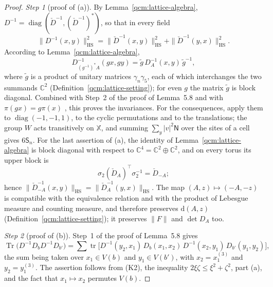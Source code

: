 \documentclass[11pt,letterpaper,reqno]{amsart}
\theoremstyle{definition}
\begin{document}
\begin{proof}
\emph{Step 1} (proof of (a)).
By Lemma~\ref{qcm:lattice-algebra}, $D^{-1}=\operatorname{diag}(\check D^{-1},(\check D^{-1})^*)$, so that in every field
\begin{equation*}
\|D^{-1}(x,y)\|^2_{\mathrm{HS}}=\|\check D^{-1}(x,y)\|^2_{\mathrm{HS}}+\|\check D^{-1}(y,x)\|^2_{\mathrm{HS}}.
\end{equation*}
According to Lemma~\ref{qcm:lattice-algebra},
\begin{equation*}
D^{-1}_{(g^{-1})^*A}(gx,gy)=\tilde g\,D_A^{-1}(x,y)\,\tilde g^{-1},
\end{equation*}
where $\tilde g$ is a product of unitary matrices $\gamma_n\gamma_5$, each of which interchanges the two summands $\mathbb C^2$ (Definition~\ref{qcm:lattice-setting}); for even $g$ the matrix $\tilde g$ is block diagonal.
Combined with Step~2 of the proof of Lemma~5.8 and with $\pi(gx)=g\pi(x)$ \cite[Proposition~2.1]{QEDConstruction}, this proves the invariances.
For the consequences, apply them to $\operatorname{diag}(-1,-1,1)$, to the cyclic permutations and to the translations; the group $W$ acts transitively on $\mathbb X$, and summing $\sum_y|v|^2\mathsf N$ over the sites of a cell gives $6\mathsf S_n$.
For the last assertion of (a), the identity of Lemma~\ref{qcm:lattice-algebra} is block diagonal with respect to $\mathbb C^4=\mathbb C^2\oplus\mathbb C^2$, and on every torus its upper block is
\begin{equation*}
\sigma_2(\check D_A)^{\top}\sigma_2^{-1}=\check D_{-A};
\end{equation*}
hence $\|\check D_{-A}^{-1}(x,\allowbreak y)\|_{\mathrm{HS}}=\allowbreak \|\check D_A^{-1}(y,\allowbreak x)\|_{\mathrm{HS}}$.
The map $(A,z)\mapsto(-A,-z)$ is compatible with the equivalence relation and with the product of Lebesgue measure and counting measure, and therefore preserves $\mathrm d(A,z)$ (Definition~\ref{qcm:lattice-setting}); it preserves $\|F\|$ and $\det D_A$ too.

\emph{Step 2} (proof of (b)).
Step~1 of the proof of Lemma~5.8 gives
\begin{equation*}
\operatorname{Tr}\bigl(D^{-1}D_bD^{-1}D_{b'}\bigr)=\sum\operatorname{tr}\bigl[D^{-1}(y_2,x_1)\,D_b(x_1,x_2)\,D^{-1}(x_2,y_1)\,D_{b'}(y_1,y_2)\bigr],
\end{equation*}
the sum being taken over $x_1\in V(b)$ and $y_1\in V(b')$, with $x_2=x_1^{(3)}$ and $y_2=y_1^{(3)}$.
The assertion follows from (K2), the inequality $2\xi\zeta\le\xi^2+\zeta^2$, part (a), and the fact that $x_1\mapsto x_2$ permutes $V(b)$.


\end{proof}
\end{document}
